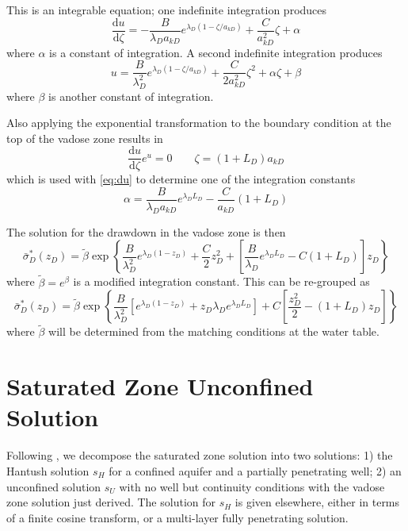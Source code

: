 \documentclass[12pt,letterpaper]{article}
\begin{document}
This is an integrable equation; one indefinite integration produces
\begin{equation}
  \label{eq:du}
  \frac{\mathrm{d} u}{\mathrm{d}\zeta} = - \frac{B}{\lambda_D a_{kD}} e^{\lambda_D (1-\zeta/a_{kD})} + \frac{C}{a_{kD}^2}\zeta + \alpha
\end{equation}
where $\alpha$ is a constant of integration. A second indefinite integration produces
\begin{equation}\nonumber
 u =  \frac{B}{\lambda_D^2} e^{\lambda_D (1-\zeta/a_{kD})} + \frac{C}{2a_{kD}^2}\zeta^2 + \alpha\zeta + \beta
\end{equation}
where $\beta$ is another constant of integration.  

Also applying the exponential transformation to the boundary condition at the top of the vadose zone results in
\begin{equation}\nonumber
\frac{\mathrm{d}u}{\mathrm{d}\zeta} e^u=0 \qquad \zeta= \left(1+ L_D \right) a_{kD}
\end{equation}
which is used with \eqref{eq:du} to determine one of the integration constants
\begin{equation}\nonumber
\alpha= \frac{B}{\lambda_D a_{kD}} e^{\lambda_D L_D} -
\frac{C}{a_{kD}} \left( 1+L_D \right) 
\end{equation}

The solution for the drawdown in the vadose zone is then
\begin{equation}
  \nonumber
  \bar{\sigma}_D^{\ast} (z_D) = \tilde{\beta}\exp\left\{
    \frac{B}{\lambda_D^2} e^{\lambda_D (1-z_D)} + \frac{C}{2}z_D^2
    +\left[ \frac{B}{\lambda_D} e^{\lambda_D L_D}  - C \left( 1+L_D\right) \right]z_D  \right\}
\end{equation}
where $\tilde{\beta}=e^\beta$ is a modified integration constant. This can be re-grouped as
\begin{equation}
  \label{eq:sigma}
  \bar{\sigma}_D^{\ast} (z_D) = \tilde{\beta}\exp\left\{
    \frac{B}{\lambda_D^2} \left[ e^{\lambda_D (1-z_D)} + z_D\lambda_D e^{\lambda_D
        L_D} \right] + C \left[ \frac{z_D^2}{2}
     - \left( 1+L_D\right)z_D  \right] \right\}
\end{equation}
where $\tilde{\beta}$ will be determined from the matching conditions at the water table.

\section{Saturated Zone Unconfined Solution}
Following \cite{mishra10}, we decompose the saturated zone solution into two solutions: 1) the Hantush solution $s_H$ for a confined aquifer and a partially penetrating well; 2) an unconfined solution $s_U$ with no well but continuity conditions with the vadose zone solution just derived.  The solution for $s_H$ is given elsewhere, either in terms of a finite cosine transform, or a multi-layer fully penetrating solution.  
\end{document}
